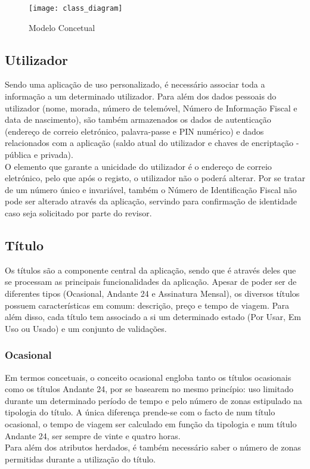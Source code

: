 \begin{figure}[t]
  \begin{center}
    \leavevmode
    \texttt{[image: class\_diagram]}
    \caption{Modelo Concetual}
    \label{fig:class_diagram}
  \end{center}
\end{figure}

\subsection{Utilizador}

Sendo uma aplicação de uso personalizado, é necessário associar toda a informação a um determinado utilizador. Para além dos dados pessoais do utilizador (nome, morada, número de telemóvel, Número de Informação Fiscal e data de nascimento), são também armazenados os dados de autenticação (endereço de correio eletrónico, palavra-passe e PIN numérico) e dados relacionados com a aplicação (saldo atual do utilizador e chaves de encriptação - pública e privada).
\\O elemento que garante a unicidade do utilizador é o endereço de correio eletrónico, pelo que após o registo, o utilizador não o poderá alterar. Por se tratar de um número único e invariável, também o Número de Identificação Fiscal não pode ser alterado através da aplicação, servindo para confirmação de identidade caso seja solicitado por parte do revisor.

\subsection{Título}

Os títulos são a componente central da aplicação, sendo que é através deles que se processam as principais funcionalidades da aplicação. Apesar de poder ser de diferentes tipos (Ocasional, Andante 24 e Assinatura Mensal), os diversos títulos possuem características em comum: descrição, preço e tempo de viagem. Para além disso, cada título tem associado a si um determinado estado (Por Usar, Em Uso ou Usado) e um conjunto de validações.

\subsubsection{Ocasional}

Em termos concetuais, o conceito ocasional engloba tanto os títulos ocasionais como os títulos Andante 24, por se basearem no mesmo princípio: uso limitado durante um determinado período de tempo e pelo número de zonas estipulado na tipologia do título. A única diferença prende-se com o facto de num título ocasional, o tempo de viagem ser calculado em função da tipologia e num título Andante 24, ser sempre de vinte e quatro horas.
\\Para além dos atributos herdados, é também necessário saber o número de zonas permitidas durante a utilização do título.

